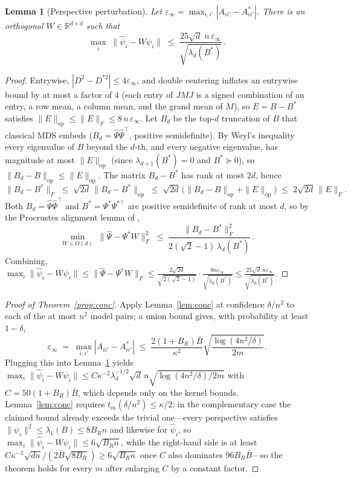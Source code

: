 \documentclass{article}
\newtheorem{lemma}{Lemma}
\theoremstyle{definition}
\theoremstyle{remark}
\theoremstyle{plain}
\begin{document}
\begin{lemma}[Perspective perturbation]
\label{lem:pert}
Let $\varepsilon_\infty=\max_{i,i'}|A_{ii'}-A^*_{ii'}|$. There is an orthogonal
$W\in\mathbb{R}^{d\times d}$ such that
\[
\max_i\;\|\hat\psi_i-W\psi_i\|\;\le\;
\frac{25\sqrt{d}\;n\,\varepsilon_\infty}{\sqrt{\lambda_d(B^*)}}\,.
\]
\end{lemma}
\begin{proof}
Entrywise, $|D^2-D^{*2}|\le4\varepsilon_\infty$, and double centering inflates an
entrywise bound by at most a factor of $4$ (each entry of $JMJ$ is a signed combination
of an entry, a row mean, a column mean, and the grand mean of $M$), so $E=B-B^*$
satisfies
$\|E\|_{\mathrm{op}}\le\|E\|_F\le8\,n\,\varepsilon_\infty$. Let $B_d$ be the top-$d$
truncation of $B$ that classical MDS embeds ($B_d=\hat\Psi\hat\Psi^\top$, positive
semidefinite). By Weyl's inequality every eigenvalue of $B$ beyond the $d$-th, and every
negative eigenvalue, has magnitude at most $\|E\|_{\mathrm{op}}$ (since
$\lambda_{d+1}(B^*)=0$ and $B^*\succeq0$), so
$\|B_d-B\|_{\mathrm{op}}\le\|E\|_{\mathrm{op}}$. The matrix $B_d-B^*$ has rank at most
$2d$, hence
\[
\|B_d-B^*\|_F\;\le\;\sqrt{2d}\,\|B_d-B^*\|_{\mathrm{op}}
\;\le\;\sqrt{2d}\,\big(\|B_d-B\|_{\mathrm{op}}+\|E\|_{\mathrm{op}}\big)
\;\le\;2\sqrt{2d}\,\|E\|_F .
\]
Both $B_d=\hat\Psi\hat\Psi^\top$ and $B^*=\Psi^*\Psi^{*\top}$ are positive semidefinite of
rank at most $d$, so by the Procrustes alignment lemma of
\citet[Lemma~5.4]{tu2016procrustes},
\[
\min_{W\in O(d)}\;\|\hat\Psi-\Psi^*W\|_F^2
\;\le\;\frac{\|B_d-B^*\|_F^2}{2(\sqrt2-1)\,\lambda_d(B^*)}\,.
\]
Combining, $\max_i\|\hat\psi_i-W\psi_i\|\le\|\hat\Psi-\Psi^*W\|_F\le
\frac{2\sqrt{2d}}{\sqrt{2(\sqrt2-1)}}\cdot\frac{8n\varepsilon_\infty}{\sqrt{\lambda_d(B^*)}}
\le\frac{25\sqrt d\,n\varepsilon_\infty}{\sqrt{\lambda_d(B^*)}}$.
\end{proof}

\begin{proof}[Proof of Theorem~\ref{prop:conc}]
Apply Lemma~\ref{lem:conc} at
confidence $\delta/n^2$ to each of the at most $n^2$ model pairs; a union bound gives,
with probability at least $1-\delta$,
\[
\varepsilon_\infty\;=\;\max_{i,i'}|A_{ii'}-A^*_{ii'}|
\;\le\;\frac{2(1+B_R)\bar B}{\kappa^{2}}\sqrt{\frac{\log(4n^{2}/\delta)}{2m}}.
\]
Plugging this into Lemma~\ref{lem:pert} yields
$\max_i\|\hat\psi_i-W\psi_i\|\le
C\kappa^{-2}\lambda_d^{-1/2}\sqrt{d}\,n\sqrt{\log(4n^{2}/\delta)/2m}$ with
$C=50(1+B_R)\bar B$, which depends only on the kernel bounds. Lemma~\ref{lem:conc}
requires $t_m(\delta/n^2)\le\kappa/2$; in the complementary case the claimed bound
already exceeds the trivial one---every perspective satisfies
$\|\psi_i\|^2\le\lambda_1(B)\le 8B_Rn$ and likewise for $\hat\psi_i$, so
$\max_i\|\hat\psi_i-W\psi_i\|\le6\sqrt{B_Rn}$, while the right-hand side is at least
$C\kappa^{-1}\sqrt{dn}/(2\bar B\sqrt{8B_R})\ge6\sqrt{B_Rn}$ once $C$ also dominates
$96B_R\bar B$---so the theorem holds for every $m$ after enlarging $C$ by a constant
factor.
\end{proof}
\end{document}
